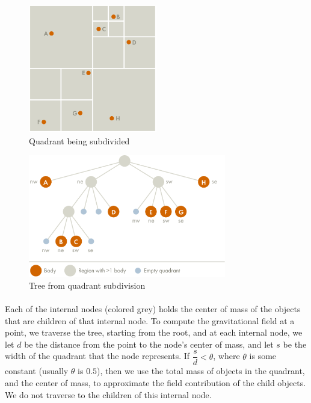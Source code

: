 \documentclass[a4paper]{article}
\begin{document}
\begin{figure}[H]
  \centering
  \includegraphics[width=0.5\textwidth]{quadrant}
  \caption{Quadrant being subdivided \cite{barnes_hut}}
\end{figure}   

\begin{figure}[H]
  \centering
  \includegraphics[width=0.77\textwidth]{quadrant_tree}
  \caption{Tree from quadrant subdivision \cite{barnes_hut}}
\end{figure}   

\paragraph{}Each of the internal nodes (colored grey) holds the center of mass of the objects that are children of that internal node. To compute the gravitational field at a point, we traverse the tree, starting from the root, and at each internal node, we let $d$ be the distance from the point to the node's center of mass, and let $s$ be the width of the quadrant that the node represents. If $\dfrac{s}{d} < \theta$, where $\theta$ is some constant (usually $\theta$ is $0.5$), then we use the total mass of objects in the quadrant, and the center of mass, to approximate the field contribution of the child objects. We do not traverse to the children of this internal node.
\end{document}
